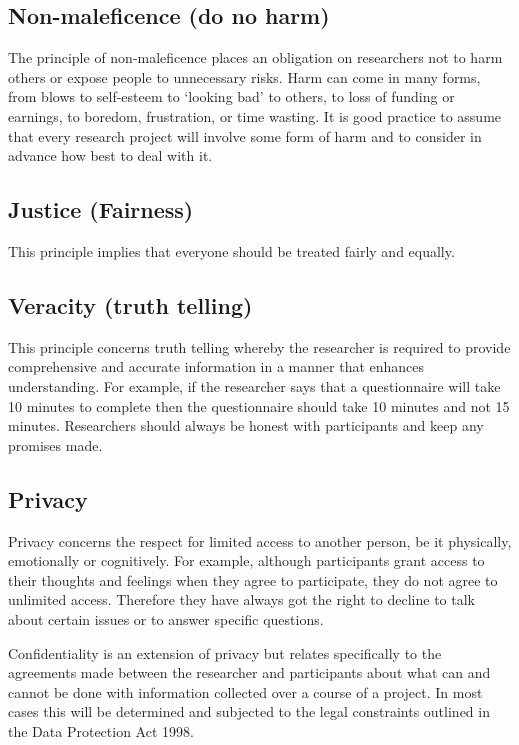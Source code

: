 \subsection{Non-maleficence (do no harm)}

The principle of non-maleficence places an obligation on researchers not to harm others or expose people to unnecessary risks. Harm can come in many forms, from blows to self-esteem to ‘looking bad’ to others, to loss of funding or earnings, to boredom, frustration, or time wasting. It is good practice to assume that every research project will involve some form of harm and to consider in advance how best to deal with it.

\subsection{Justice (Fairness)}

This principle implies that everyone should be treated fairly and equally.

\subsection{Veracity (truth telling)}

This principle concerns truth telling whereby the researcher is required to provide comprehensive and accurate information in a manner that enhances understanding. For example, if the researcher says that a questionnaire will take 10 minutes to complete then the questionnaire should take 10 minutes and not 15 minutes. Researchers should always be honest with participants and keep any promises made.

\subsection{Privacy}

Privacy concerns the respect for limited access to another person, be it physically, emotionally or cognitively. For example, although participants grant access to their thoughts and feelings when they agree to participate, they do not agree to unlimited access. Therefore they have always got the right to decline to talk about certain issues or to answer specific questions.

Confidentiality is an extension of privacy but relates specifically to the agreements made between the researcher and participants about what can and cannot be done with information collected over a course of a project. In most cases this will be determined and subjected to the legal constraints outlined in the Data Protection Act 1998.

